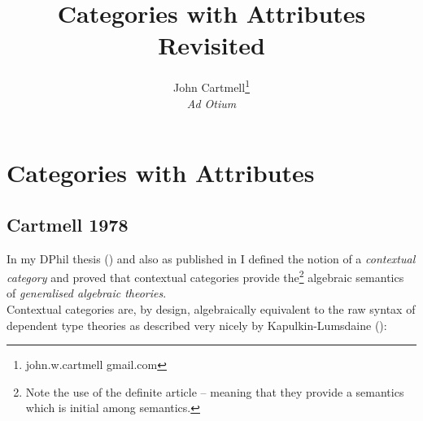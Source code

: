 \documentclass[14pt,a4paper]{scrartcl}
\title{Categories with Attributes Revisited}
\author{John Cartmell\footnote{john.w.cartmell gmail.com}\\ \normalsize{\textit{Ad Otium}}}
\renewcommand{\erpictureFolder}[0]{../SharedPictures}
\begin{document}
\maketitle

\section{Categories with Attributes} 




\subsection{Cartmell 1978}

In my DPhil thesis (\cite{Cartmell78}) and also as published in \cite{Cartmell86}
I defined the notion of a \textit{contextual category} and proved that contextual
categories provide the\footnote{Note the use of the definite article -- meaning that they provide a semantics which is initial among semantics.} algebraic semantics of \textit{generalised algebraic theories}. \\

\noindent 
Contextual categories are, by design,  algebraically equivalent to the raw syntax of dependent type theories as described very nicely by Kapulkin-Lumsdaine (\cite{kapulkinlumsdaine2012}): \\
\end{document}
